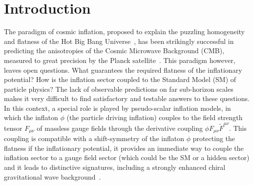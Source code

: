 
\section{Introduction\label{sec:introduction}}
The paradigm of cosmic inflation, proposed to explain the puzzling homogeneity and flatness of the Hot Big Bang Universe~\cite{Guth:1980zm}, has been strikingly successful in predicting the anisotropies of the Cosmic Microwave Background (CMB), measured to great precision by the Planck satellite~\cite{Ade:2015lrj}. This paradigm however, leaves open questions. What guarantees the required flatness of the inflationary potential? How is the inflation sector coupled to the Standard Model (SM) of particle physics? The lack of observable predictions on far sub-horizon scales makes it very difficult to find satisfactory and testable answers to these questions. In this context, a special role is played by pseudo-scalar inflation models, in which the inflaton $\phi$ (the particle driving inflation) couples to the field strength tensor $F_{\mu \nu}$ of massless gauge fields through the derivative coupling $\phi F_{\mu \nu} \tilde F^{\mu \nu}$. This coupling is compatible with a shift-symmetry of the inflaton $\phi$ protecting the flatness if the inflationary potential, it provides an immediate way to couple the inflation sector to a gauge field sector (which could be the SM or a hidden sector) and it leads to distinctive signatures, including a strongly enhanced chiral gravitational wave background~\cite{Cook:2011hg,Dimastrogiovanni:2012ew,Adshead:2013qp}.

